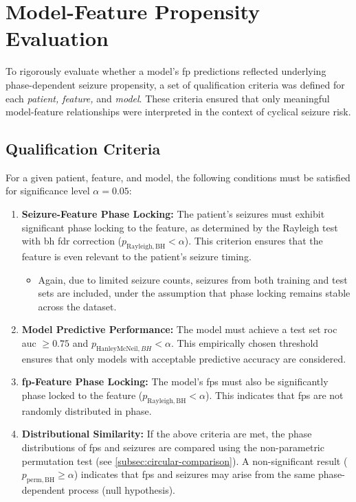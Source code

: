 \section{Model-Feature Propensity Evaluation} \label{sec:propensity-eval}

To rigorously evaluate whether a model's \gls{fp} predictions reflected underlying phase-dependent seizure propensity, a set of qualification criteria was defined for each \textit{patient, feature,} and \textit{model}.
These criteria ensured that only meaningful model-feature relationships were interpreted in the context of cyclical seizure risk.

\subsection{Qualification Criteria} \label{subsec:qualification-criteria}
For a given patient, feature, and model, the following conditions must be satisfied for significance level $\alpha = 0.05$:

\begin{enumerate}
    \item \textbf{Seizure-Feature Phase Locking:} The patient's seizures must exhibit significant phase locking to the feature, as determined by the Rayleigh test with \gls{bh} \gls{fdr} correction ($p_{\mathrm{Rayleigh, BH}} < \alpha$). This criterion ensures that the feature is even relevant to the patient's seizure timing.
    \begin{itemize}
        \item Again, due to limited seizure counts, seizures from both training and test sets are included, under the assumption that phase locking remains stable across the dataset.
    \end{itemize}
    \item \textbf{Model Predictive Performance:} The model must achieve a test set \gls{roc auc} $\geq 0.75$ and $p_{\mathrm{HanleyMcNeil}, BH}<\alpha$.
    This empirically chosen threshold ensures that only models with acceptable predictive accuracy are considered.
    \item \textbf{\gls{fp}-Feature Phase Locking:} The model's \glspl{fp} must also be significantly phase locked to the feature ($p_{\mathrm{Rayleigh, BH}} < \alpha$). This indicates that \glspl{fp} are not randomly distributed in phase.
    \item \textbf{Distributional Similarity:} If the above criteria are met, the phase distributions of \glspl{fp} and seizures are compared using the non-parametric permutation test (see \cref{subsec:circular-comparison}). A non-significant result ($p_{\mathrm{perm, BH}} \geq \alpha$) indicates that \glspl{fp} and seizures may arise from the same phase-dependent process (null hypothesis).
\end{enumerate}

